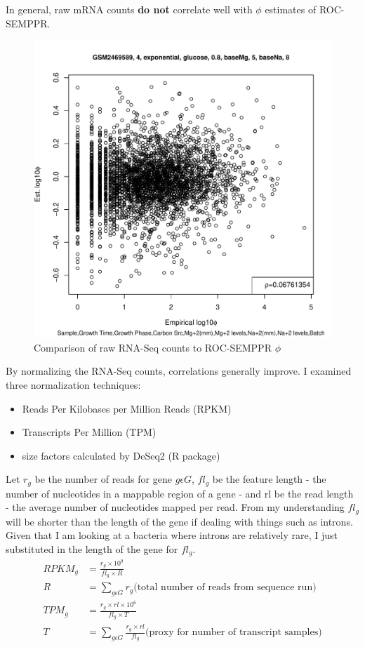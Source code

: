 \documentclass[11pt]{labbook}
\begin{document}

In general, raw mRNA counts \textbf{do not} correlate well with $\phi$ estimates of ROC-SEMPPR.
\begin{figure}[H]
\centering
\includegraphics[page=1,scale=0.6]{Ecoli_REL606/GSE94117_raw_mrna.pdf}
\caption{Comparison of raw RNA-Seq counts to ROC-SEMPPR $\phi$}
\end{figure}


By normalizing the RNA-Seq counts, correlations generally improve. I examined three normalization techniques:
\begin{itemize}
\item Reads Per Kilobases per Million Reads (RPKM) 
\item Transcripts Per Million (TPM)
\item size factors calculated by DeSeq2 (R package)
\end{itemize}

Let $r_g$ be the number of reads for gene $g \epsilon G$, $fl_g$ be the feature length - the number of nucleotides in a mappable region of a gene - and rl be the read length - the average number of nucleotides mapped per read. From my understanding $fl_g$ will be shorter than the length of the gene if dealing with things such as introns. Given that I am looking at a bacteria where introns are relatively rare, I just substituted in the length of the gene for $fl_g$.  
\begin{align}
RPKM_g &= \frac{r_g \times 10^9}{fl_g \times R} \\
R & = \sum_{g \epsilon G} r_g \text{(total number of reads from sequence run)}\\
TPM_g &= \frac{r_g \times rl \times 10^6}{fl_g \times T} \\
T &= \sum_{g \epsilon G} \frac{r_g \times rl}{fl_g} \text{(proxy for number of transcript samples)}
\end{align}
 
\end{document}
